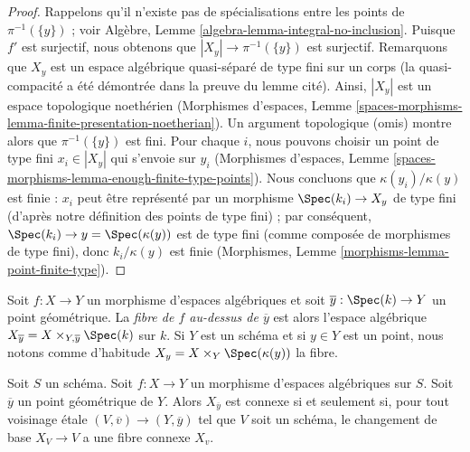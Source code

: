\begin{proof}
Rappelons qu'il n'existe pas de spécialisations entre les points de $\pi^{-1}(\{y\})$ ;
voir Algèbre, Lemme \ref{algebra-lemma-integral-no-inclusion}.
Puisque $f'$ est surjectif, nous obtenons que $|X_y| \to \pi^{-1}(\{y\})$ est surjectif.
Remarquons que $X_y$ est un espace algébrique quasi-séparé de type fini
sur un corps (la quasi-compacité a été démontrée dans la preuve du
lemme cité). Ainsi, $|X_y|$ est un espace topologique noethérien
(Morphismes d'espaces, Lemme
\ref{spaces-morphisms-lemma-finite-presentation-noetherian}).
Un argument topologique (omis) montre alors que $\pi^{-1}(\{y\})$ est fini.
Pour chaque $i$, nous pouvons choisir un point de type fini $x_i \in |X_y|$
qui s'envoie sur $y_i$ (Morphismes d'espaces, Lemme
\ref{spaces-morphisms-lemma-enough-finite-type-points}).
Nous concluons que $\kappa(y_i)/\kappa(y)$ est finie :
$x_i$ peut être représenté par un morphisme $\Spec(k_i) \to X_y$
de type fini (d'après notre définition des points de type fini) ;
par conséquent, $\Spec(k_i) \to y = \Spec(\kappa(y))$ est de type fini
(comme composée de morphismes de type fini),
donc $k_i/\kappa(y)$ est finie (Morphismes, Lemme
\ref{morphisms-lemma-point-finite-type}).
\end{proof}

\noindent
Soit $f : X \to Y$ un morphisme d'espaces algébriques et soit
$\overline{y} : \Spec(k) \to Y$ un point géométrique. La
{\it fibre de $f$ au-dessus de $\overline{y}$} est alors l'espace algébrique
$X_{\overline{y}} = X \times_{Y, \overline{y}} \Spec(k)$ sur $k$.
Si $Y$ est un schéma et si $y \in Y$ est un point, nous notons comme d'habitude
$X_y = X \times_Y \Spec(\kappa(y))$ la fibre.

\begin{lemma}
\label{lemma-characterize-geometrically-connected-fibres}
Soit $S$ un schéma. Soit $f : X \to Y$ un morphisme d'espaces algébriques
sur $S$. Soit $\overline{y}$ un point géométrique de $Y$. Alors
$X_{\overline{y}}$ est connexe si et seulement si, pour tout voisinage
étale $(V, \overline{v}) \to (Y, \overline{y})$ tel que $V$
soit un schéma, le changement de base $X_V \to V$ a une fibre connexe $X_v$.
\end{lemma}

